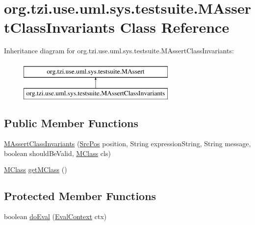 \hypertarget{classorg_1_1tzi_1_1use_1_1uml_1_1sys_1_1testsuite_1_1_m_assert_class_invariants}{\section{org.\-tzi.\-use.\-uml.\-sys.\-testsuite.\-M\-Assert\-Class\-Invariants Class Reference}
\label{classorg_1_1tzi_1_1use_1_1uml_1_1sys_1_1testsuite_1_1_m_assert_class_invariants}
}
Inheritance diagram for org.\-tzi.\-use.\-uml.\-sys.\-testsuite.\-M\-Assert\-Class\-Invariants\-:\begin{figure}[H]
\begin{center}
\leavevmode
\includegraphics[height=2.000000cm]{classorg_1_1tzi_1_1use_1_1uml_1_1sys_1_1testsuite_1_1_m_assert_class_invariants}
\end{center}
\end{figure}
\subsection*{Public Member Functions}
\begin{DoxyCompactItemize}
\item 
\hyperlink{classorg_1_1tzi_1_1use_1_1uml_1_1sys_1_1testsuite_1_1_m_assert_class_invariants_a55bd06e4a40762748c98504fd6fca7b2}{M\-Assert\-Class\-Invariants} (\hyperlink{classorg_1_1tzi_1_1use_1_1parser_1_1_src_pos}{Src\-Pos} position, String expression\-String, String message, boolean should\-Be\-Valid, \hyperlink{interfaceorg_1_1tzi_1_1use_1_1uml_1_1mm_1_1_m_class}{M\-Class} cls)
\item 
\hyperlink{interfaceorg_1_1tzi_1_1use_1_1uml_1_1mm_1_1_m_class}{M\-Class} \hyperlink{classorg_1_1tzi_1_1use_1_1uml_1_1sys_1_1testsuite_1_1_m_assert_class_invariants_acc0b1648c9eb983a102288e8924ee9dc}{get\-M\-Class} ()
\end{DoxyCompactItemize}
\subsection*{Protected Member Functions}
\begin{DoxyCompactItemize}
\item 
boolean \hyperlink{classorg_1_1tzi_1_1use_1_1uml_1_1sys_1_1testsuite_1_1_m_assert_class_invariants_a75380f9ff748750744ee6470e1e0d37f}{do\-Eval} (\hyperlink{classorg_1_1tzi_1_1use_1_1uml_1_1ocl_1_1expr_1_1_eval_context}{Eval\-Context} ctx)
\end{DoxyCompactItemize}


